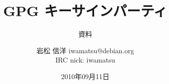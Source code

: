 




\documentclass[cjk,dvipdfmx,12pt]{beamer}
\usepackage{monthlypresentation}



\title{GPG キーサインパーティ}
\subtitle{資料}
\author{岩松 信洋 iwamatsu@debian.org\\IRC nick: iwamatsu}
\date{2010年09月11日}



